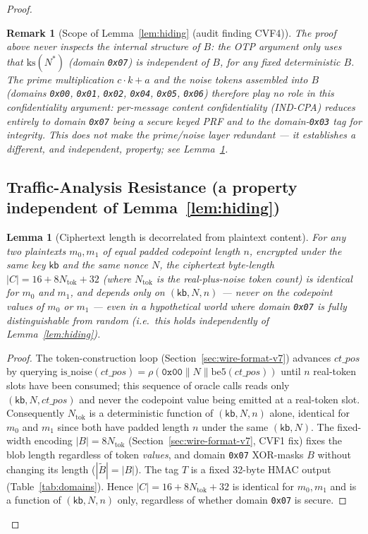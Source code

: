 \documentclass[11pt,a4paper]{article}
\newtheorem{lemma}[theorem]{Lemma}
\newtheorem{remark}[theorem]{Remark}
\begin{document}
\begin{proof}
\begin{remark}[Scope of Lemma~\ref{lem:hiding} (audit finding CVF4)]
\label{rem:hiding-scope}
The proof above never inspects the internal structure of $B$: the
OTP argument only uses that $\mathrm{ks}(N^*)$ (domain \texttt{0x07}) is
independent of $B$, for \emph{any} fixed deterministic $B$. The prime
multiplication $c \cdot k + a$ and the noise tokens assembled into $B$
(domains \texttt{0x00}, \texttt{0x01}, \texttt{0x02}, \texttt{0x04},
\texttt{0x05}, \texttt{0x06}) therefore play no role in this
confidentiality argument: per-message content confidentiality (IND-CPA)
reduces entirely to domain \texttt{0x07} being a secure keyed PRF and to
the domain-\texttt{0x03} tag for integrity. This does not make the
prime/noise layer redundant --- it establishes a different, and
independent, property; see Lemma~\ref{lem:tar}.
\end{remark}

\subsection{Traffic-Analysis Resistance (a property independent of Lemma~\ref{lem:hiding})}
\label{sec:traffic-analysis}

\begin{lemma}[Ciphertext length is decorrelated from plaintext content]
\label{lem:tar}
For any two plaintexts $m_0, m_1$ of equal padded codepoint length $n$,
encrypted under the same key $\mathsf{kb}$ and the same nonce $N$, the
ciphertext byte-length $|C| = 16 + 8N_{\mathrm{tok}} + 32$ (where
$N_{\mathrm{tok}}$ is the real-plus-noise token count) is identical for
$m_0$ and $m_1$, and depends only on $(\mathsf{kb}, N, n)$ --- never on the
codepoint values of $m_0$ or $m_1$ --- even in a hypothetical world where
domain \texttt{0x07} is fully distinguishable from random (i.e.\ this
holds independently of Lemma~\ref{lem:hiding}).
\end{lemma}

\begin{proof}
The token-construction loop (Section~\ref{sec:wire-format-v7}) advances
$ct\_pos$ by querying $\mathrm{is\_noise}(ct\_pos) = \rho(\texttt{0x00}\|N\|\mathrm{be5}(ct\_pos))$
until $n$ real-token slots have been consumed; this sequence of oracle
calls reads only $(\mathsf{kb}, N, ct\_pos)$ and never the codepoint value
being emitted at a real-token slot. Consequently $N_{\mathrm{tok}}$ is a
deterministic function of $(\mathsf{kb}, N, n)$ alone, identical for $m_0$
and $m_1$ since both have padded length $n$ under the same $(\mathsf{kb},
N)$. The fixed-width encoding $|B| = 8 N_{\mathrm{tok}}$
(Section~\ref{sec:wire-format-v7}, CVF1 fix) fixes the blob length
regardless of token \emph{values}, and domain \texttt{0x07} XOR-masks $B$
without changing its length ($|\widetilde{B}|=|B|$). The tag $T$ is a
fixed 32-byte HMAC output (Table~\ref{tab:domains}). Hence
$|C| = 16 + 8N_{\mathrm{tok}} + 32$ is identical for $m_0, m_1$ and is a
function of $(\mathsf{kb}, N, n)$ only, regardless of whether domain
\texttt{0x07} is secure.
\end{proof}


\end{proof}
\end{document}
